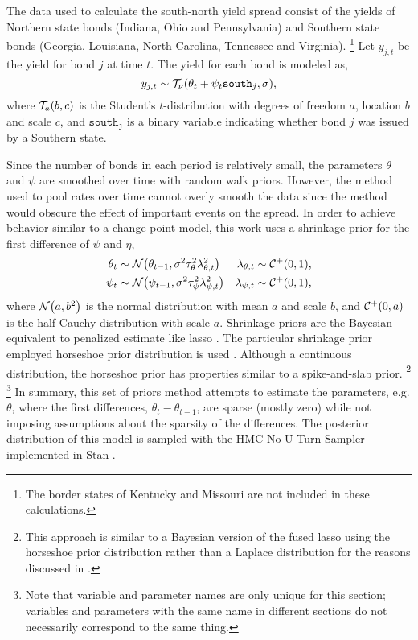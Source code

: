 The data used to calculate the south-north yield spread consist of the yields of Northern state bonds (Indiana, Ohio and Pennsylvania) and Southern state bonds (Georgia, Louisiana, North Carolina, Tennessee and Virginia).
\footnote{The border states of Kentucky and Missouri are not included in these calculations.}
Let $y_{j,t}$ be the yield for bond $j$ at time $t$.
The yield for each bond is modeled as,
\begin{equation}
  y_{j,t} \sim \mathcal{T}_{\nu}\mathopen{}\left(\theta_{t} + \psi_{t} \mathtt{south}_{j}, \sigma\right)\mathclose{} \text{,}
\end{equation}
where $\mathcal{T}_{a}\mathopen{}\left(b, c\right)\mathclose{}$ is the Student's $t$-distribution with degrees of freedom $a$, location $b$ and scale $c$, and
$\mathtt{south_{j}}$ is a binary variable indicating whether bond $j$ was issued by a Southern state.

Since the number of bonds in each period is relatively small, the parameters $\theta$ and $\psi$ are smoothed over time with random walk priors.
However, the method used to pool rates over time cannot overly smooth the data since the method would obscure the effect of important events on the spread.
In order to achieve behavior similar to a change-point model, this work uses a shrinkage prior for the first difference of $\psi$ and $\eta$,
\begin{align}
  \theta_{t} & \sim \mathcal{N}\mathopen{}\left(\theta_{t-1}, \sigma^{2} \tau_{\theta}^{2} \lambda_{\theta,t}^{2}\right)\mathclose{}
  & \lambda_{\theta,t} & \sim \mathcal{C^+}\mathopen{}\left(0, 1\right)\mathclose{} \text{,} \\
  \psi_{t} & \sim \mathcal{N}\mathopen{}\left(\psi_{t-1}, \sigma^{2} \tau_{\psi}^{2} \lambda_{\psi,t}^{2}\right)\mathclose{}
  & \lambda_{\psi,t} & \sim \mathcal{C^+}\mathopen{}\left(0, 1\right)\mathclose{} \text{,}
\end{align}
where $\mathcal{N}\mathopen{}\left(a, b^{2}\right)\mathclose{}$ is the normal distribution with mean $a$ and scale $b$, and $\mathcal{C^+}\mathopen{}\left(0, a\right)\mathclose{}$ is the half-Cauchy distribution with scale $a$.%
Shrinkage priors are the Bayesian equivalent to penalized estimate like lasso \parencites{Tibshirani1996}{ParkCasella2008}.
The particular shrinkage prior employed horseshoe prior distribution is used \parencites{CarvalhoPolsonScott2009}{CarvalhoPolsonScott2009}.
Although a continuous distribution, the horseshoe prior has properties similar to a spike-and-slab prior.%
\footnote{This approach is similar to a Bayesian version of the fused lasso \textcite{TibshiraniEtAl2005} using the horseshoe prior distribution rather than a Laplace distribution for the reasons discussed in \parencites{CarvalhoPolsonScott2009}{CarvalhoPolsonScott2009}.}
\footnote{Note that variable and parameter names are only unique for this section; variables and parameters with the same name in different sections do not necessarily correspond to the same thing.}
In summary, this set of priors method attempts to estimate the parameters, e.g. $\theta$, where the first differences, $\theta_{t} - \theta_{t-1}$, are sparse (mostly zero) while not imposing assumptions about the sparsity of the differences.
The posterior distribution of this model is sampled with the HMC No-U-Turn Sampler implemented in Stan \parencites{Stan2014}{HoffmanGelman2014a}.

